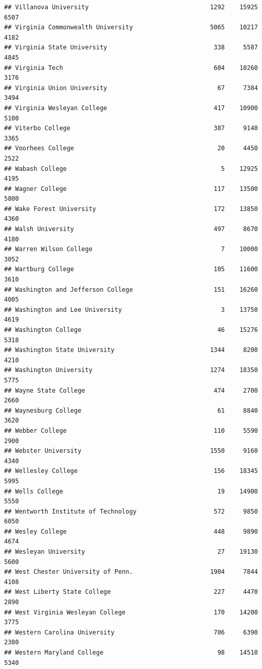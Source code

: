 \documentclass[
]{article}
\begin{document}
\begin{verbatim}
## Villanova University                                 1292    15925       6507
## Virginia Commonwealth University                     5065    10217       4182
## Virginia State University                             338     5587       4845
## Virginia Tech                                         604    10260       3176
## Virginia Union University                              67     7384       3494
## Virginia Wesleyan College                             417    10900       5100
## Viterbo College                                       387     9140       3365
## Voorhees College                                       20     4450       2522
## Wabash College                                          5    12925       4195
## Wagner College                                        117    13500       5800
## Wake Forest University                                172    13850       4360
## Walsh University                                      497     8670       4180
## Warren Wilson College                                   7    10000       3052
## Wartburg College                                      105    11600       3610
## Washington and Jefferson College                      151    16260       4005
## Washington and Lee University                           3    13750       4619
## Washington College                                     46    15276       5318
## Washington State University                          1344     8200       4210
## Washington University                                1274    18350       5775
## Wayne State College                                   474     2700       2660
## Waynesburg College                                     61     8840       3620
## Webber College                                        110     5590       2900
## Webster University                                   1550     9160       4340
## Wellesley College                                     156    18345       5995
## Wells College                                          19    14900       5550
## Wentworth Institute of Technology                     572     9850       6050
## Wesley College                                        448     9890       4674
## Wesleyan University                                    27    19130       5600
## West Chester University of Penn.                     1904     7844       4108
## West Liberty State College                            227     4470       2890
## West Virginia Wesleyan College                        170    14200       3775
## Western Carolina University                           706     6390       2380
## Western Maryland College                               98    14510       5340

\end{verbatim}
\end{document}
